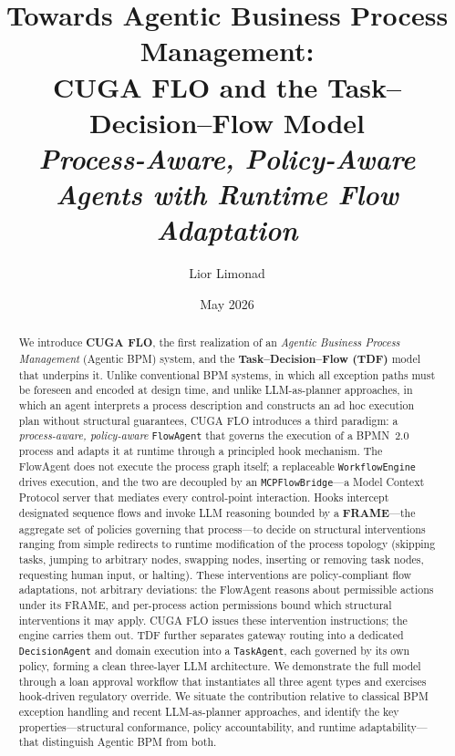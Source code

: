 \documentclass[11pt,a4paper]{article}
\title{%
  \textbf{Towards Agentic Business Process Management:}\\[6pt]
  \large CUGA FLO and the Task--Decision--Flow Model\\[4pt]
  \normalsize \textit{Process-Aware, Policy-Aware Agents with Runtime Flow Adaptation}
}
\author[1]{Lior Limonad}
\affil[1]{CUGA Research}
\date{May 2026}
\begin{document}
\maketitle
\thispagestyle{plain}

\begin{abstract}
We introduce \textbf{CUGA FLO}, the first realization of an \emph{Agentic Business
Process Management} (Agentic BPM) system, and the \textbf{Task--Decision--Flow
(TDF)} model that underpins it. Unlike conventional BPM systems, in which all
exception paths must be foreseen and encoded at design time, and unlike
LLM-as-planner approaches, in which an agent interprets a process description and
constructs an ad hoc execution plan without structural guarantees, CUGA FLO
introduces a third paradigm: a \emph{process-aware, policy-aware} \texttt{FlowAgent}
that governs the execution of a BPMN~2.0 process and adapts it at runtime through a
principled hook mechanism. The FlowAgent does not execute the process graph itself;
a replaceable \texttt{WorkflowEngine} drives execution, and the two are decoupled by
an \texttt{MCPFlowBridge}---a Model Context Protocol server that mediates every
control-point interaction. Hooks intercept designated sequence flows and invoke
LLM reasoning bounded by a \textbf{FRAME}---the aggregate set of policies governing
that process---to decide on structural interventions ranging from simple redirects
to runtime modification of the process topology (skipping tasks, jumping to
arbitrary nodes, swapping nodes, inserting or removing task nodes, requesting human
input, or halting). These interventions are
policy-compliant flow adaptations, not arbitrary deviations: the FlowAgent reasons
about permissible actions under its FRAME, and per-process action permissions bound
which structural interventions it may apply. CUGA FLO issues these intervention
instructions; the engine carries them out. TDF further separates gateway routing
into a dedicated \texttt{DecisionAgent} and domain execution into a \texttt{TaskAgent}, each
governed by its own policy, forming a clean three-layer LLM architecture.
We demonstrate the full model through a loan approval workflow that instantiates all
three agent types and exercises hook-driven regulatory override. We situate the
contribution relative to classical BPM exception handling and recent LLM-as-planner
approaches, and identify the key properties---structural conformance, policy
accountability, and runtime adaptability---that distinguish Agentic BPM from both.
\end{abstract}
\end{document}
